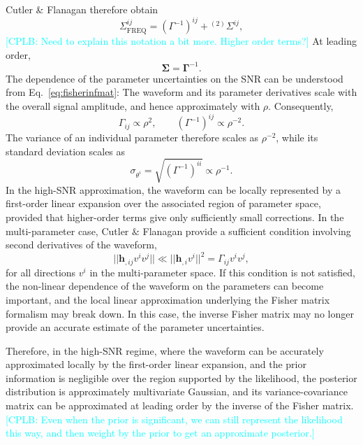 \documentclass[a4paper,12pt]{article}
\newcommand{\cplb}[1]{\textcolor{cyan}{[CPLB: #1]}}
\begin{document}
Cutler \& Flanagan therefore obtain
\begin{equation}
\Sigma^{ij}_{\mathrm{FREQ}} = (\Gamma^{-1})^{ij} + {}^{(2)}\Sigma^{ij},
\label{eq:covleadingorder}
\end{equation}
\cplb{Need to explain this notation a bit more. Higher order terms?}
At leading order,
\begin{equation}
\boldsymbol{\Sigma} = \boldsymbol{\Gamma}^{-1}.
\label{eq:vecscovfisher}
\end{equation}
The dependence of the parameter uncertainties on the SNR can be understood from Eq.~\eqref{eq:fisherinfmat}: The waveform and its parameter derivatives scale with the overall signal amplitude, and hence approximately with $\rho$. Consequently,
\begin{equation}
\Gamma_{ij}\propto\rho^2,
\qquad
(\Gamma^{-1})^{ij}\propto\rho^{-2}.
\end{equation}
The variance of an individual parameter therefore scales as $\rho^{-2}$, while its standard deviation scales as
\begin{equation}
\sigma_{\theta^i} = \sqrt{(\Gamma^{-1})^{ii}}
\propto
\rho^{-1}.
\label{eq:fishererrorsnr}
\end{equation}
In the high-SNR approximation, the waveform can be locally represented by a first-order linear expansion over the associated region of parameter space, provided that higher-order terms give only sufficiently small corrections. In the multi-parameter case, Cutler $\&$ Flanagan provide a sufficient condition involving second derivatives of the waveform,
\begin{equation}
||\mathbf{h}_{,ij}v^{i}v^{j}||
\ll
||\mathbf{h}_{,i}v^{i}||^{2}
= \Gamma_{ij}v^{i}v^{j},
\label{eq:highSNRcond}
\end{equation}
for all directions $v^{i}$ in the multi-parameter space. If this condition is not satisfied, the non-linear dependence of the waveform on the parameters can become important, and the local linear approximation underlying the Fisher matrix formalism may break down. In this case, the inverse Fisher matrix may no longer provide an accurate estimate of the parameter uncertainties. 

Therefore, in the high-SNR regime, where the waveform can be accurately approximated locally by the first-order linear expansion, and the prior information is negligible over the region supported by the likelihood, the posterior distribution is approximately multivariate Gaussian, and its variance-covariance matrix can be approximated at leading order by the inverse of the Fisher matrix.
\cplb{Even when the prior is significant, we can still represent the likelihood this way, and then weight by the prior to get an approximate posterior.}
\end{document}
